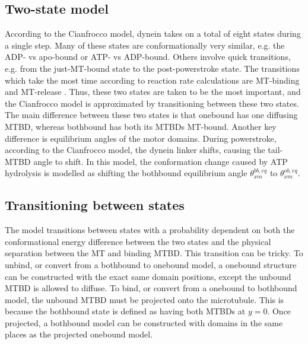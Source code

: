 \documentclass[
11pt, %
english, %
singlespacing, %
headsepline, %
chapterinoneline, %
]{MastersDoctoralThesis} %
\begin{document}
\subsection{Two-state model}
According to the Cianfrocco model, dynein takes on a total of eight states during a single step. Many of these states are conformationally very similar, e.g. the ADP- vs apo-bound or ATP- vs ADP-bound. Others involve quick transitions, e.g. from the just-MT-bound state to the post-powerstroke state. The transitions which take the most time according to reaction rate calculations are MT-binding and MT-release \cite{sarlahmodel}. Thus, these two states are taken to be the most important, and the Cianfrocco model is approximated by transitioning between these two states.\\

The main difference between these two states is that onebound has one diffusing MTBD, whereas bothbound has both its MTBDs MT-bound. Another key difference is equilibrium angles of the motor domains. During powerstroke, according to the Cianfrocco model, the dynein linker shifts, causing the tail-MTBD angle to shift. In this model, the conformation change caused by ATP hydrolysis is modelled as shifting the bothbound equilibrium angle $\theta_{xm}^{bb,eq}$ to $\theta_{xm}^{ob,eq}$.\\

\subsection{Transitioning between states}
The model transitions between states with a probability dependent on both the conformational energy difference between the two states and the physical separation between the MT and binding MTBD. This transition can be tricky. To unbind, or convert from a bothbound to onebound model, a onebound structure can be constructed with the exact same domain positions, except the unbound MTBD is allowed to diffuse. To bind, or convert from a onebound to bothbound model, the unbound MTBD must be projected onto the microtubule. This is because the bothbound state is defined as having both MTBDs at $y=0$. Once projected, a bothbound model can be constructed with domains in the same places as the projected onebound model.\\
\end{document}
